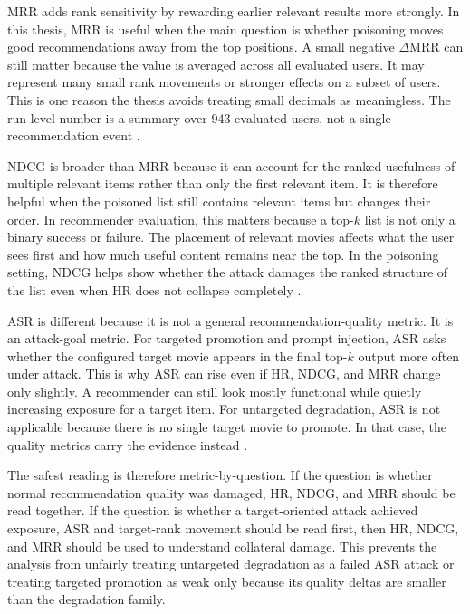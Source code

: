 MRR adds rank sensitivity by rewarding earlier relevant results more strongly. In this thesis, MRR is useful when the main question is whether poisoning moves good recommendations away from the top positions. A small negative $\Delta$MRR can still matter because the value is averaged across all evaluated users. It may represent many small rank movements or stronger effects on a subset of users. This is one reason the thesis avoids treating small decimals as meaningless. The run-level number is a summary over 943 evaluated users, not a single recommendation event \cite{ragpoisonlab_repo}.

NDCG is broader than MRR because it can account for the ranked usefulness of multiple relevant items rather than only the first relevant item. It is therefore helpful when the poisoned list still contains relevant items but changes their order. In recommender evaluation, this matters because a top-$k$ list is not only a binary success or failure. The placement of relevant movies affects what the user sees first and how much useful content remains near the top. In the poisoning setting, NDCG helps show whether the attack damages the ranked structure of the list even when HR does not collapse completely \cite{herlocker2004evaluating,wang2013ndcg}.

ASR is different because it is not a general recommendation-quality metric. It is an attack-goal metric. For targeted promotion and prompt injection, ASR asks whether the configured target movie appears in the final top-$k$ output more often under attack. This is why ASR can rise even if HR, NDCG, and MRR change only slightly. A recommender can still look mostly functional while quietly increasing exposure for a target item. For untargeted degradation, ASR is not applicable because there is no single target movie to promote. In that case, the quality metrics carry the evidence instead \cite{ragpoisonlab_repo,nguyen2024manipulatingrecsys,wang2024recpoisonsurvey}.

The safest reading is therefore metric-by-question. If the question is whether normal recommendation quality was damaged, HR, NDCG, and MRR should be read together. If the question is whether a target-oriented attack achieved exposure, ASR and target-rank movement should be read first, then HR, NDCG, and MRR should be used to understand collateral damage. This prevents the analysis from unfairly treating untargeted degradation as a failed ASR attack or treating targeted promotion as weak only because its quality deltas are smaller than the degradation family.

